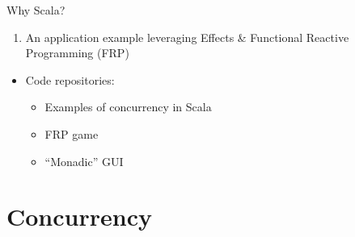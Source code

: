 \documentclass[presentation, 9pt]{beamer}\mode<presentation>{\usetheme{AMSBolognaFC}}
\begin{document}
\begin{frame}{Why Scala?}
\begin{itemize}
\begin{enumerate}
      \item An application example leveraging Effects \& Functional Reactive Programming (FRP)
		\end{enumerate}
	\end{itemize}
	\begin{itemize}
		\item Code repositories:
		\begin{itemize}
			\item Examples of concurrency in Scala \href{https://github.com/cric96/scala-concurrent-programming}{\faLink}
   		\item FRP game \href{https://github.com/cric96/scala-frp-gui}{\faLink}
     	\item ``Monadic'' GUI \href{https://github.com/cric96/scala-functional-gui}{\faLink}  
		\end{itemize}
	\end{itemize}
\end{frame}
\section{Concurrency}
\end{document}
